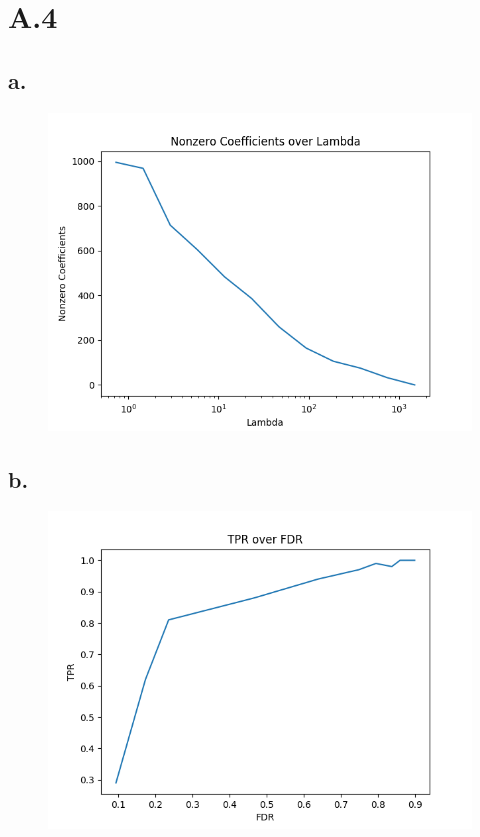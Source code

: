 \documentclass{article}
\newcommand{\1}{\mathbf{1}}
\begin{document}
\section*{A.4}
{\Large 

\subsection*{a.}

\begin{figure}[h]
  \centering
  \includegraphics[width=160mm]{../hw2-code/results/a4_a.png}
\end{figure}

\newpage

\subsection*{b.}

\begin{figure}[h]
  \centering
  \includegraphics[width=160mm]{../hw2-code/results/a4_b.png}
\end{figure}

}
\end{document}
